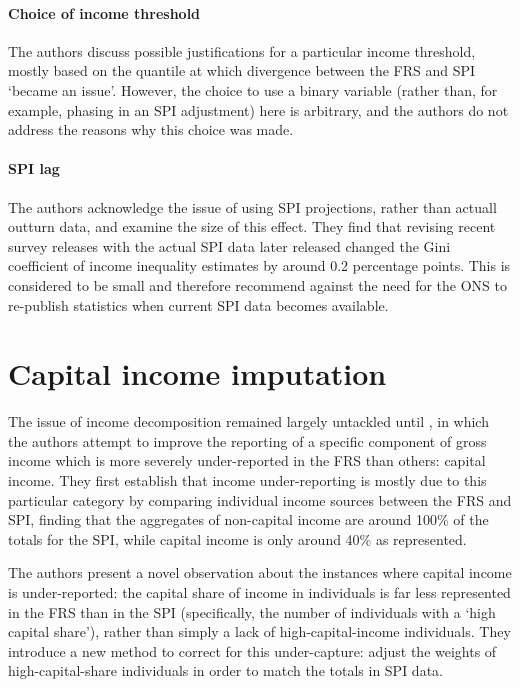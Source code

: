 \documentclass{article}
\begin{document}
\paragraph{Choice of income threshold} The authors discuss possible justifications for a particular income threshold, mostly based on the quantile at which divergence between the FRS and SPI `became an issue'. However, the choice to use a binary variable (rather than, for example, phasing in an SPI adjustment) here is arbitrary, and the authors do not address the reasons why this choice was made.

\paragraph{SPI lag} The authors acknowledge the issue of using SPI projections, rather than actuall outturn data, and examine the size of this effect. They find that revising recent survey releases with the actual SPI data later released changed the Gini coefficient of income inequality estimates by around 0.2 percentage points. This is considered to be small and therefore recommend against the need for the ONS to re-publish statistics when current SPI data becomes available.

\section{Capital income imputation}

The issue of income decomposition remained largely untackled until \cite{frs_capital_income}, in which the authors attempt to improve the reporting of a specific component of gross income which is more severely under-reported in the FRS than others: capital income. They first establish that income under-reporting is mostly due to this particular category by comparing individual income sources between the FRS and SPI, finding that the aggregates of non-capital income are around 100\% of the totals for the SPI, while capital income is only around 40\% as represented.

The authors present a novel observation about the instances where capital income is under-reported: the capital share of income in individuals is far less represented in the FRS than in the SPI (specifically, the number of individuals with a `high capital share'), rather than simply a lack of high-capital-income individuals. They introduce a new method to correct for this under-capture: adjust the weights of high-capital-share individuals in order to match the totals in SPI data.
\end{document}
